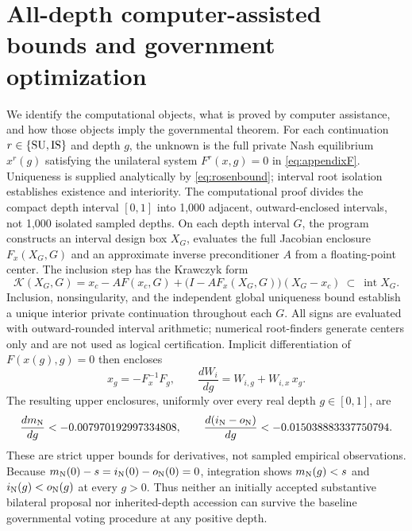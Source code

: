 \section{All-depth computer-assisted bounds and government optimization}\label{app:interval}
We identify the computational objects, what is proved by computer assistance, and how those objects imply the governmental theorem. For each continuation $r\in\{\mathrm{SU},\mathrm{IS}\}$ and depth $g$, the unknown is the full private Nash equilibrium $x^r(g)$ satisfying the unilateral system $F^r(x,g)=0$ in \eqref{eq:appendixF}. Uniqueness is supplied analytically by \eqref{eq:rosenbound}; interval root isolation establishes existence and interiority. The computational proof divides the compact depth interval $[0,1]$ into 1,000 adjacent, outward-enclosed intervals, not 1,000 isolated sampled depths. On each depth interval $G$, the program constructs an interval design box $X_G$, evaluates the full Jacobian enclosure $F_x(X_G,G)$ and an approximate inverse preconditioner $A$ from a floating-point center. The inclusion step has the Krawczyk form
\begin{equation}\label{eq:kraw}
\mathcal K(X_G,G)=x_c-AF(x_c,G)+\bigl(I-AF_x(X_G,G)\bigr)(X_G-x_c)\ \subset\ \operatorname{int}X_G.
\end{equation}
Inclusion, nonsingularity, and the independent global uniqueness bound establish a unique interior private continuation throughout each $G$. All signs are evaluated with outward-rounded interval arithmetic; numerical root-finders generate centers only and are not used as logical certification. Implicit differentiation of $F(x(g),g)=0$ then encloses
\begin{equation}\label{eq:totalder}
x_g=-F_x^{-1}F_g,\qquad
\frac{dW_i}{dg}=W_{i,g}+W_{i,x}\,x_g.
\end{equation}
The resulting upper enclosures, uniformly over every real depth $g\in[0,1]$, are
\begin{equation}\label{eq:certmargins}
\frac{d m_{\mathrm{N}}}{dg}<-0.007970192997334808,\qquad
\frac{d(i_{\mathrm{N}}-o_{\mathrm{N}})}{dg}<-0.015038883337750794.
\end{equation}
These are strict upper bounds for derivatives, not sampled empirical observations. Because $m_{\mathrm{N}}(0)-s=i_{\mathrm{N}}(0)-o_{\mathrm{N}}(0)=0$, integration shows $m_{\mathrm{N}}(g)<s$ and $i_{\mathrm{N}}(g)<o_{\mathrm{N}}(g)$ at every $g>0$. Thus neither an initially accepted substantive bilateral proposal nor inherited-depth accession can survive the baseline governmental voting procedure at any positive depth.

